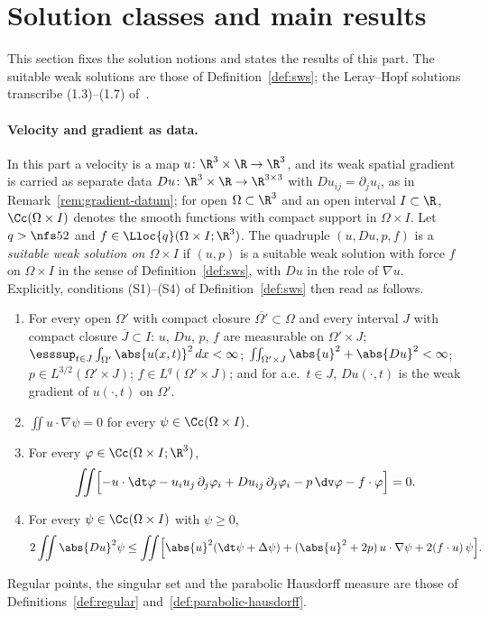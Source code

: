 \documentclass[11pt,reqno]{amsart}
\begin{document}
\section{Solution classes and main results}\label{sec:leray-hopf}

This section fixes the solution notions and states the results of this part.
The suitable weak solutions are those of Definition~\ref{def:sws}; the
Leray--Hopf solutions transcribe (1.3)--(1.7) of~\cite{ESS2003}.

\paragraph{Velocity and gradient as data.}
In this part a velocity is a map $u\colon\R^3\times\R\to\R^3$, and its
weak spatial gradient is carried as separate data
$Du\colon\R^3\times\R\to\R^{3\times3}$ with $Du_{ij}=\partial_j u_i$, as in
Remark~\ref{rem:gradient-datum}; for open $\Omega\subset\R^3$ and an open
interval $I\subset\R$, $\Cc(\Omega\times I)$ denotes the smooth functions with
compact support in $\Omega\times I$. Let $q>\nfs52$ and
$f\in\Lloc{q}(\Omega\times I;\R^3)$. The quadruple $(u,Du,p,f)$ is a
\emph{suitable weak solution on $\Omega\times I$} if $(u,p)$ is a suitable
weak solution with force $f$ on $\Omega\times I$ in the sense of
Definition~\ref{def:sws}, with $Du$ in the role of $\nabla u$. Explicitly,
conditions (S1)--(S4) of Definition~\ref{def:sws} then read as follows.
\begin{enumerate}[label=(S\arabic*)]
\item For every open $\Omega'$ with compact closure
  $\overline{\Omega'}\subset\Omega$ and every interval $J$ with compact closure
  $\overline J\subset I$: $u$, $Du$, $p$, $f$ are measurable on
  $\Omega'\times J$;
  $\esssup_{t\in J}\int_{\Omega'}\abs{u(x,t)}^2\,dx<\infty$;
  $\iint_{\Omega'\times J}\abs{u}^2+\abs{Du}^2<\infty$;
  $p\in L^{3/2}(\Omega'\times J)$; $f\in L^q(\Omega'\times J)$; and for
  a.e.\ $t\in J$, $Du(\cdot,t)$ is the weak gradient of $u(\cdot,t)$ on
  $\Omega'$.
\item $\iint u\cdot\nabla\psi=0$ for every $\psi\in\Cc(\Omega\times I)$.
\item For every $\varphi\in\Cc(\Omega\times I;\R^3)$,
  \[
  \iint\Bigl[-u\cdot\dt\varphi-u_iu_j\,\partial_j\varphi_i+Du_{ij}\,\partial_j\varphi_i
    -p\,\dv\varphi-f\cdot\varphi\Bigr]=0 .
  \]
\item For every $\psi\in\Cc(\Omega\times I)$ with $\psi\ge0$,
  \[
  2\iint\abs{Du}^2\psi\le\iint\Bigl[\abs{u}^2(\dt\psi+\Delta\psi)
    +(\abs{u}^2+2p)\,u\cdot\nabla\psi+2(f\cdot u)\,\psi\Bigr].
  \]
\end{enumerate}
Regular points, the singular set and the parabolic Hausdorff measure are those
of Definitions~\ref{def:regular} and~\ref{def:parabolic-hausdorff}.
\end{document}
